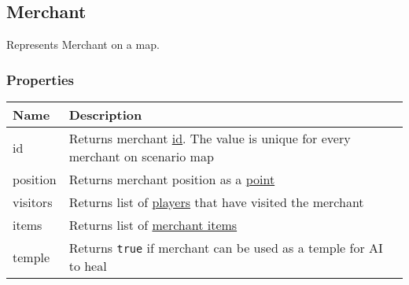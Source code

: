 \subsection{Merchant}
\label{Merchant}
Represents Merchant on a map.
\subsubsection{Properties}
\begin{center}
\begin{tabularx}{\linewidth}{| l | X |}
\hline
\textbf{Name} & \textbf{Description} \\
\hline
id & Returns merchant \hyperref[Id]{id}. The value is unique for every merchant on scenario map\\
\hline
position & Returns merchant position as a \hyperref[Point]{point}\\
\hline
visitors & Returns list of \hyperref[Player]{players} that have visited the merchant\\
\hline
items & Returns list of \hyperref[MerchantItem]{merchant items}\\
\hline
temple & Returns \texttt{true} if merchant can be used as a temple for AI to heal\\
\hline
\end{tabularx}
\end{center}